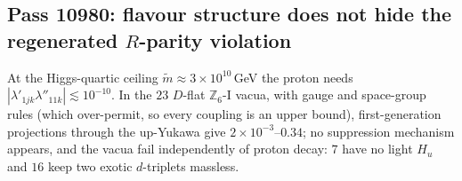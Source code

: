 \subsection{Pass 10980: flavour structure does not hide the regenerated $R$-parity violation}

At the Higgs-quartic ceiling $\tilde m\approx3\times10^{10}$\,GeV the proton needs $|\lambda'_{1jk}\lambda''_{11k}|\lesssim10^{-10}$.
In the $23$ $D$-flat $\mathbb{Z}_6$-I vacua, with gauge and space-group rules (which over-permit, so every coupling is an upper
bound), first-generation projections through the up-Yukawa give $2\times10^{-3}$--$0.34$; no suppression mechanism appears,
and the vacua fail independently of proton decay: $7$ have no light $H_u$ and $16$ keep two exotic $d$-triplets massless.
